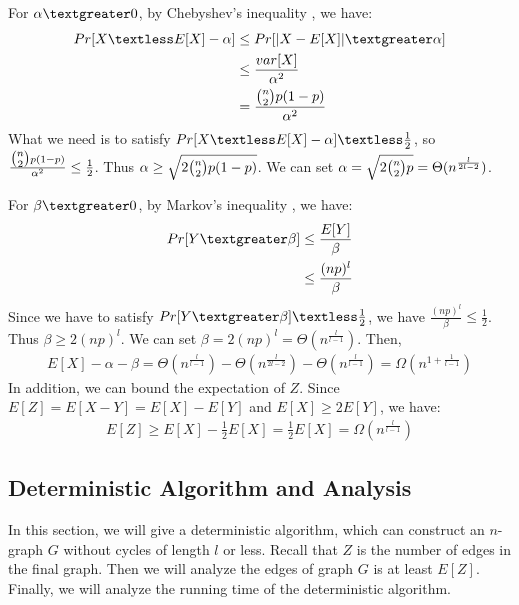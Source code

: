 For $\alpha \textgreater 0$, by 
Chebyshev's inequality
, we have:
\begin{align}
    \nonumber Pr[X\textless E[X]-\alpha]&\le Pr[|X-E[X]|\textgreater \alpha]\\ 
    \nonumber &\le \frac{var[X]}{\alpha^2}\\
    \nonumber &=\frac{\tbinom{n}{2}p(1-p)}{\alpha^2}
\end{align}
What we need is to satisfy $Pr[X\textless E[X]-\alpha] \textless \frac{1}{2}$, so $\frac{\tbinom{n}{2}p(1-p)}{\alpha^2}\le \frac{1}{2} $. Thus $\alpha \ge \sqrt{2\tbinom{n}{2}p(1-p)}$. We can set $\alpha = \sqrt{2\tbinom{n}{2}p}=\Theta(n^{\frac{l}{2l-2}})$.

For $\beta \textgreater 0$, by 
Markov's inequality
, we have: 
\begin{align}
    \nonumber Pr[Y \textgreater \beta] &\le \frac{E[Y]}{\beta}\\
    \nonumber & \le \frac{(np)^l}{\beta} 
\end{align}
Since we have to satisfy $Pr[Y \textgreater \beta]\textless \frac{1}{2}$, we have $\frac{(np)^l}{\beta} \le \frac{1}{2}$. Thus $\beta \ge 2(np)^l$. We can set $\beta = 2(np)^l = \Theta (n^{\frac{l}{l-1}})$.
Then,
\begin{align}
    \nonumber E[X]-\alpha-\beta = \Theta (n^\frac{l}{l-1}) - \Theta(n^{\frac{l}{2l-2}}) - \Theta (n^{\frac{l}{l-1}})=\Omega (n^{1+\frac{1}{l-1}})
\end{align}
In addition, we can bound the expectation of $Z$.
Since $E[Z]=E[X-Y]=E[X]-E[Y]$ and $E[X]\ge 2E[Y]$, we have:
\begin{align}
    \nonumber E[Z]\ge E[X]-\frac{1}{2}E[X]=\frac{1}{2}E[X]=\Omega (n^\frac{l}{l-1})
\end{align}
\subsection{Deterministic Algorithm and Analysis}
In this section, we will give a deterministic algorithm, which can construct an $n$-graph $G$ without cycles of length $l$ or less. 
Recall that $Z$ is the number of edges in the final graph.
Then we will analyze the edges of graph $G$ is at least $E[Z]$. 
Finally, we will analyze the running time of the deterministic algorithm.
